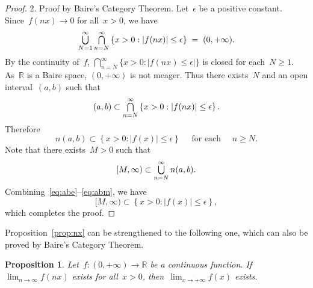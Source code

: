 \documentclass[11pt,a4paper]{article}  %
\newcommand{\bibfile}{baire.bib}  %
\newtheorem{proposition}{Proposition}[section]
\theoremstyle{definition}
\DeclareMathOperator*{\mcap}{\mathsmaller{\bigcap}}
\DeclareMathOperator*{\mcup}{\mathsmaller{\bigcup}}
\def\real{\mathbb{R}}
\numberwithin{equation}{section}
\begin{document}
\begin{proof}
  2. Proof by Baire's Category Theorem. Let~$\epsilon$ be a positive constant. Since~$f(nx)\to 0$
     for all~$x>0$, we have
  \begin{equation}
    \mcup_{N=1}^\infty \mcap_{n=N}^\infty\left\{ x >0 \mathrel{:} |f(nx)| \le \epsilon \right\}
    \;=\; (0,+\infty).
  \end{equation}
  By the continuity of~$f$, $\bigcap_{n=N}^\infty \{x> 0 \mathrel{:} |f(nx)\le \epsilon|\}$ is closed for
  each~$N \ge 1$.
  As~$\real$ is a Baire space, $(0,+\infty)$ is not meager. Thus there exists~$N$ and an open
  interval~$(a, b)$ such that
  \begin{equation}
    (a, b) \subset \mcap_{n=N}^\infty\left\{ x >0 \mathrel{:} |f(nx)| \le \epsilon \right\}.
  \end{equation}
  Therefore
  \begin{equation}
    \label{eq:abe}
    n(a, b) \subset \left\{ x >0 \mathrel{:} |f(x)| \le \epsilon \right\}
    \quad \text{ for each } \quad n\ge N.
  \end{equation}
  Note that there exists~$M >0$ such that
  \begin{equation}
    \label{eq:abm}
    [M, \infty) \subset \mcup_{n=N}^\infty n(a,b).
  \end{equation}
  Combining~\eqref{eq:abe}--\eqref{eq:abm}, we have
  \begin{equation}
    [M, \infty) \subset \left\{ x >0 \mathrel{:} |f(x)| \le \epsilon \right\},
  \end{equation}
  which completes the proof.

\end{proof}

Proposition~\ref{prop:nx} can be strengthened to the following one, which can also be proved by
Baire's Category Theorem.

\begin{proposition}
  Let~$f\mathrel{:} (0,+\infty)\to \real$ be a continuous function. If~$\lim_{n\to \infty}f(nx)$
  exists for all~$x>0$, then~$\lim_{x\to +\infty} f(x)$ exists.
\end{proposition}


\small


\end{document}
